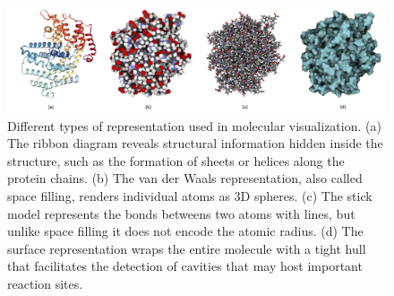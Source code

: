 \begin{figure}
	
	\centering
	\includegraphics[width=.90\textwidth]{graphics/Picture13}
	
	\caption{Different types of representation used in molecular visualization. (a) The ribbon diagram reveals structural information hidden inside the structure, such as the formation of sheets or helices along the protein chains. (b) The van der Waals representation, also called space filling, renders individual atoms as 3D spheres. (c) The stick model represents the bonds betweens two atoms with lines, but unlike space filling it does not encode the atomic radius. (d) The surface representation wraps the entire molecule with a tight hull that facilitates the detection of cavities that may host important reaction sites.}
	\label{fig:representations}
	
\end{figure}

%	
%	
%	

